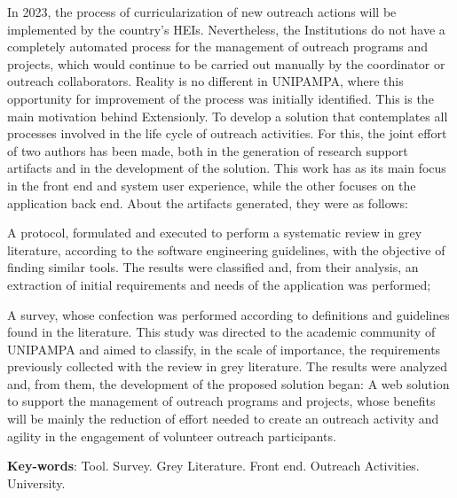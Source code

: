 \begin{resumo}[Abstract]
  In 2023, the process of curricularization of new outreach actions will be implemented by the country's \aclp{HEI}. Nevertheless, the Institutions do not have a completely automated process for the management of outreach programs and projects, which would continue to be carried out manually by the coordinator or outreach collaborators. Reality is no different in \acs{UNIPAMPA}, where this opportunity for improvement of the process was initially identified. This is the main motivation behind Extensionly. To develop a solution that contemplates all processes involved in the life cycle of outreach activities. For this, the joint effort of two authors has been made, both in the generation of research support artifacts and in the development of the solution. This work has as its main focus in the front end and system user experience, while the other focuses on the application back end. About the artifacts generated, they were as follows:
  \begin{inparaenum}[(a)]
    \item A protocol, formulated and executed to perform a systematic review in grey literature, according to the software engineering guidelines, with the objective of finding similar tools. The results were classified and, from their analysis, an extraction of initial requirements and needs of the application was performed;
    \item A survey, whose confection was performed according to definitions and guidelines found in the literature. This study was directed to the academic community of \acs{UNIPAMPA} and aimed to classify, in the scale of importance, the requirements previously collected with the review in grey literature. The results were analyzed and, from them, the development of the proposed solution began: A web solution to support the management of outreach programs and projects, whose benefits will be mainly the reduction of effort needed to create an outreach activity and agility in the engagement of volunteer outreach participants.
  \end{inparaenum}

  \vspace{\onelineskip}

  \noindent
  \textbf{Key-words}: Tool. Survey. Grey Literature. Front end. Outreach Activities. University.
\end{resumo}
